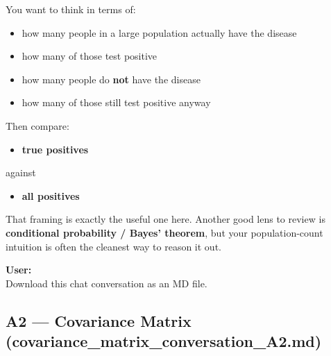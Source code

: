 \documentclass{article}
\begin{document}
\begin{mdframed}
You want to think in terms of:
\begin{itemize}[leftmargin=*]
    \item how many people in a large population actually have the disease
    \item how many of those test positive
    \item how many people do \textbf{not} have the disease
    \item how many of those still test positive anyway
\end{itemize}

Then compare:
\begin{itemize}[leftmargin=*]
    \item \textbf{true positives}
\end{itemize}
against
\begin{itemize}[leftmargin=*]
    \item \textbf{all positives}
\end{itemize}

That framing is exactly the useful one here. Another good lens to review is \textbf{conditional probability / Bayes' theorem}, but your population-count intuition is often the cleanest way to reason it out.

\bigskip
\textbf{User:} \\
Download this chat conversation as an MD file.
\end{mdframed}

\subsection*{A2 --- Covariance Matrix (covariance\_matrix\_conversation\_A2.md)}
\end{document}
